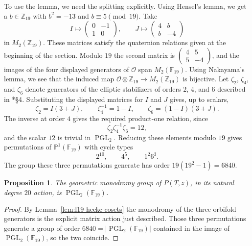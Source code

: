 \documentclass[10pt]{amsart}
\numberwithin{equation}{section}
\newtheorem{proposition}[theorem]{Proposition}
\theoremstyle{definition}
\theoremstyle{remark}
\newcommand{\PP}{\mathbb P}
\newcommand{\F}{\mathbb{F}}
\newcommand{\Z}{\mathbb{Z}}
\newcommand{\PGL}{\operatorname{PGL}}
\begin{document}
To use the lemma, we need the splitting explicitly. Using Hensel's lemma, we get a
$b\in\Z_{19}$ with $b^2=-13$ and $b\equiv5\pmod {19}$. Take
\[
 I\longmapsto\begin{pmatrix}0&-1\\1&0\end{pmatrix},
 \qquad
 J\longmapsto\begin{pmatrix}4&b\\b&-4\end{pmatrix}
 \]
in $M_2(\Z_{19})$. These matrices satisfy the quaternion relations given at the beginning of the section. Modulo $19$ the second matrix is
$\left(\begin{smallmatrix}4&5\\5&-4\end{smallmatrix}\right)$, and the images
of the four displayed generators of $\mathcal O$ span $M_2(\F_{19})$.
Using Nakayama's lemma, we see that the induced map
$\mathcal O\otimes\Z_{19}\to M_2(\Z_{19})$ is bijective. Let $\zeta_2$, $\zeta_4$, and $\zeta_6$ denote generators of the elliptic stabilizers of orders $2$, $4$, and $6$ described in \cite{YangSchwarzian}*{\S4}. Substituting the displayed matrices for $I$ and $J$ gives, up to scalars,
\[
 \zeta_2=I(3+J),\qquad\zeta_4^{-1}=1-I,\qquad\zeta_6=(1-I)(3+J).
\]
The inverse at order $4$ gives the required product-one relation, since
\[
 \zeta_2\zeta_4^{-1}\zeta_6=12,
\]
and the scalar $12$ is trivial in $\PGL_2$. Reducing these elements modulo $19$ gives permutations of $\PP^1(\F_{19})$ with cycle types
\begin{equation}\label{eq:l19-folded-passport}
 2^{10},\qquad 4^5,\qquad 1^2 6^3.
\end{equation}
The group these three permutations generate has order
$19(19^2-1)=6840$.

\begin{proposition}\label{prop:l19-yang-pgl}
The geometric monodromy group of $P(T,z)$, in its natural degree $20$ action, is
$\PGL_2(\F_{19})$.
\end{proposition}

\begin{proof}
By Lemma~\ref{lem:l19-hecke-cosets} the monodromy of the three orbifold
generators is the explicit matrix action just described.  Those three
permutations generate a group of order $6840=|\PGL_2(\F_{19})|$ contained in
the image of $\PGL_2(\F_{19})$, so the two coincide.
\end{proof}
\end{document}
